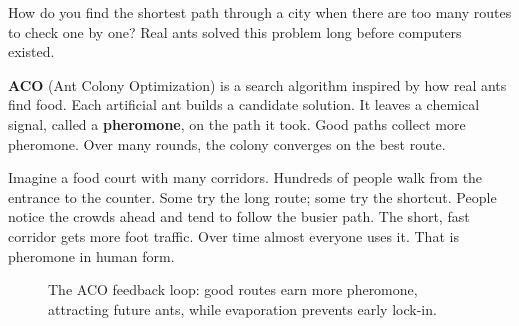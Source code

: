 \documentclass[a4paper,11pt]{article}
\newcommand{\vocab}[1]{\textbf{\color{navy}#1}}
\begin{document}
How do you find the shortest path through a city when there are too many
routes to check one by one?
Real ants solved this problem long before computers existed.

\begin{intuition}
\vocab{ACO} (Ant Colony Optimization) is a search algorithm inspired by
how real ants find food.
Each artificial ant builds a candidate solution.
It leaves a chemical signal, called a \vocab{pheromone}, on the path it
took.
Good paths collect more pheromone.
Over many rounds, the colony converges on the best route.
\end{intuition}

\begin{everyday}
Imagine a food court with many corridors.
Hundreds of people walk from the entrance to the counter.
Some try the long route; some try the shortcut.
People notice the crowds ahead and tend to follow the busier path.
The short, fast corridor gets more foot traffic.
Over time almost everyone uses it.
That is pheromone in human form.
\end{everyday}

\begin{figure}[htbp]
\centering
{}
\caption*{\small\color{mutedtext}The ACO feedback loop: good routes earn more pheromone, attracting future ants, while evaporation prevents early lock-in.}
\end{figure}
\end{document}
